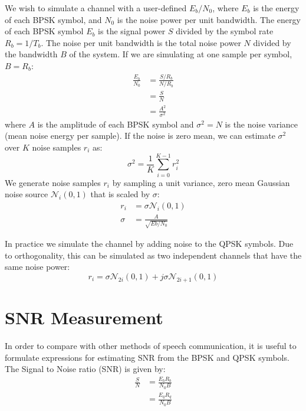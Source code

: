 \documentclass{article}
\begin{document}
We wish to simulate a channel with a user-defined $E_b/N_0$, where $E_b$ is the energy of each BPSK symbol, and $N_0$ is the noise power per unit bandwidth.  The energy of each BPSK symbol $E_b$ is the signal power $S$ divided by the symbol rate $R_b=1/T_b$.  The noise per unit bandwidth is the total noise power $N$ divided by the bandwidth $B$ of the system.  If we are simulating at one sample per symbol, $B=R_b$:
\begin{equation}
\begin{split}
\frac{E_b}{N_0} &= \frac{S/R_b}{N/R_b} \\
                &= \frac{S}{N} \\
                &= \frac{A^2}{\sigma^2}
\end{split}
\end{equation}
where $A$ is the amplitude of each BPSK symbol and $\sigma^2=N$ is the noise variance (mean noise energy per sample).  If the noise is zero mean, we can estimate $\sigma^2$ over $K$ noise samples $r_i$ as:
\begin{equation}
\sigma^2 = \frac{1}{K}\sum_{i=0}^{K-1}r_i^2
\end{equation}
We generate noise samples $r_i$ by sampling a unit variance, zero mean Gaussian noise source $\mathcal{N}_i(0,1)$ that is scaled by $\sigma$:
\begin{equation}
\begin{split}
r_i &= \sigma \mathcal{N}_i(0,1) \\
\sigma &= \frac{A}{\sqrt{Eb/N_0}}
\end{split}
\end{equation}

In practice we simulate the channel by adding noise to the QPSK symbols.  Due to orthogonality, this can be simulated as two independent channels that have the same noise power:
\begin{equation}
r_i = \sigma \mathcal{N}_{2i}(0,1) + j\sigma\mathcal{N}_{2i+1}(0,1)
\end{equation}

\section{SNR Measurement}

In order to compare with other methods of speech communication, it is useful to formulate expressions for estimating SNR from the BPSK and QPSK symbols.  The Signal to Noise ratio (SNR) is given by:
\begin{equation}
\label{eq:snr_theory}
\begin{split}
\frac{S}{N} &= \frac{E_bR_b}{N_0B} \\
            &= \frac{E_qR_q}{N_0B}
\end{split}
\end{equation}
\end{document}
